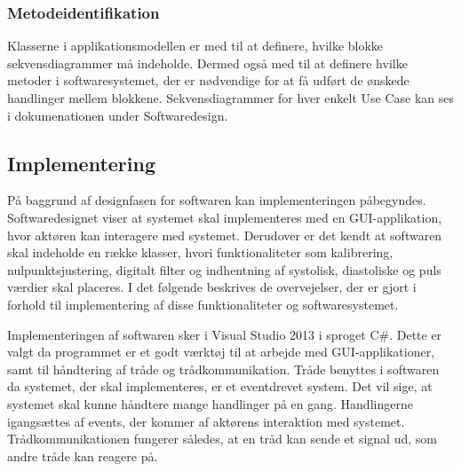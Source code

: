 \subsubsection{Metodeidentifikation}
Klasserne i applikationsmodellen er med til at definere, hvilke blokke sekvensdiagrammer må indeholde. Dermed også med til at definere hvilke metoder i softwaresystemet, der er nødvendige for at få udført de ønskede handlinger mellem blokkene. Sekvensdiagrammer for hver enkelt Use Case kan ses i dokumenationen under Softwaredesign. 

\subsection{Implementering}
På baggrund af designfasen for softwaren kan implementeringen påbegyndes. Softwaredesignet viser at systemet skal implementeres med en GUI-applikation, hvor aktøren kan interagere med systemet. Derudover er det kendt at softwaren skal indeholde en række klasser, hvori funktionaliteter som kalibrering, nulpunktsjustering, digitalt filter og indhentning af systolisk, diastoliske og puls værdier skal placeres. I det følgende beskrives de overvejelser, der er gjort i forhold til implementering af disse funktionaliteter og softwaresystemet. 

Implementeringen af softwaren sker i Visual Studio 2013 i sproget C\#. Dette er valgt da programmet er et godt værktøj til at arbejde med GUI-applikationer, samt til håndtering af tråde og trådkommunikation. Tråde benyttes i softwaren da systemet, der skal implementeres, er et eventdrevet system. Det vil sige, at systemet skal kunne håndtere mange handlinger på en gang. Handlingerne igangsættes af events, der kommer af aktørens interaktion med systemet. Trådkommunikationen fungerer således, at en tråd kan sende et signal ud, som andre tråde kan reagere på.

